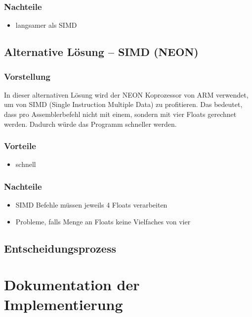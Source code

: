 \documentclass[11pt]{scrartcl}
\begin{document}
\subsubsection{Nachteile}
\begin{itemize}
\item langsamer als SIMD
\end{itemize}
\subsection{Alternative Lösung -- SIMD (NEON)}
\subsubsection{Vorstellung}
In dieser alternativen Lösung wird der NEON Koprozessor von ARM verwendet, um von SIMD (Single Instruction Multiple Data)
zu profitieren. Das bedeutet, dass pro Assemblerbefehl nicht mit einem, sondern mit vier Floats gerechnet werden. Dadurch würde das Programm schneller werden.
\subsubsection{Vorteile}
\begin{itemize}
\item schnell
\end{itemize}
\subsubsection{Nachteile}
\begin{itemize}
\item SIMD Befehle müssen jeweils 4 Floats verarbeiten
\item Probleme, falls Menge an Floats keine Vielfaches von vier
\end{itemize}
\subsection{Entscheidungsprozess}
\section{Dokumentation der Implementierung}
\end{document}
